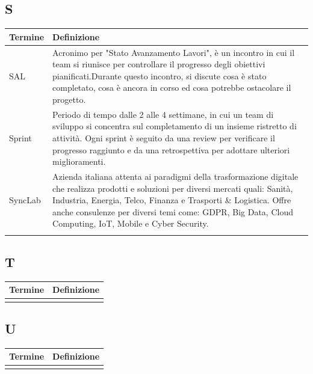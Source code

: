 \documentclass[10pt]{article}
\begin{document}
\subsection{S} %
\begin{tabularx}{\textwidth}{|>{\centering\arraybackslash}l|X|}
\hline
\rowcolor[gray]{0.8}
\textbf{Termine} & \textbf{Definizione}\\
\hline
SAL & Acronimo per "Stato Avanzamento Lavori", è un incontro in cui il team si riunisce per controllare il progresso degli obiettivi pianificati.\newline Durante questo incontro, si discute cosa è stato completato, cosa è ancora in corso ed cosa potrebbe ostacolare il progetto.\\
\hline
Sprint & Periodo di tempo dalle 2 alle 4 settimane, in cui un team di sviluppo si concentra sul completamento di un insieme ristretto di attività. Ogni sprint è seguito da una review per verificare il progresso raggiunto e da una retrospettiva per adottare ulteriori miglioramenti.\\
\hline
SyncLab & Azienda italiana attenta ai paradigmi della trasformazione digitale che realizza prodotti e soluzioni per diversi mercati quali: Sanità, Industria, Energia, Telco, Finanza e Trasporti \& Logistica. Offre anche consulenze per diversi temi come: GDPR, Big Data, Cloud Computing, IoT, Mobile e Cyber Security.\\
\hline
 & \\
\hline
\end{tabularx}

\subsection{T} %
\begin{tabularx}{\textwidth}{|>{\centering\arraybackslash}l|X|}
\hline
\rowcolor[gray]{0.8}
\textbf{Termine} & \textbf{Definizione}\\
\hline
 & \\
\hline
\end{tabularx}

\subsection{U} %
\begin{tabularx}{\textwidth}{|>{\centering\arraybackslash}l|X|}
\hline
\rowcolor[gray]{0.8}
\textbf{Termine} & \textbf{Definizione}\\
\hline
 & \\
\hline
\end{tabularx}
\end{document}
